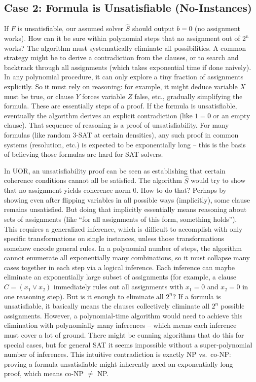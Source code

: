\documentclass[11pt]{article}
\begin{document}
\subsection{Case 2: Formula is Unsatisfiable (No-Instances)}
If \(F\) is unsatisfiable, our assumed solver \(\hat{S}\) should output \(b=0\) (no assignment works). How can it be sure within polynomial steps that no assignment out of \(2^n\) works? The algorithm must systematically eliminate all possibilities. A common strategy might be to derive a contradiction from the clauses, or to search and backtrack through all assignments (which takes exponential time if done naively). In any polynomial procedure, it can only explore a tiny fraction of assignments explicitly. So it must rely on reasoning: for example, it might deduce variable \(X\) must be true, or clause \(Y\) forces variable \(Z\) false, etc., gradually simplifying the formula. These are essentially steps of a proof. If the formula is unsatisfiable, eventually the algorithm derives an explicit contradiction (like \(1=0\) or an empty clause). That sequence of reasoning is a proof of unsatisfiability. For many formulas (like random 3-SAT at certain densities), any such proof in common systems (resolution, etc.) is expected to be exponentially long -- this is the basis of believing those formulas are hard for SAT solvers.

In UOR, an unsatisfiability proof can be seen as establishing that certain coherence conditions cannot all be satisfied. The algorithm \(\hat{S}\) would try to show that no assignment yields coherence norm 0. How to do that? Perhaps by showing even after flipping variables in all possible ways (implicitly), some clause remains unsatisfied. But doing that implicitly essentially means reasoning about sets of assignments (like “for all assignments of this form, something holds”). This requires a generalized inference, which is difficult to accomplish with only specific transformations on single instances, unless those transformations somehow encode general rules. In a polynomial number of steps, the algorithm cannot enumerate all exponentially many combinations, so it must collapse many cases together in each step via a logical inference. Each inference can maybe eliminate an exponentially large subset of assignments (for example, a clause \(C = (x_1 \vee x_2)\) immediately rules out all assignments with \(x_1=0\) and \(x_2=0\) in one reasoning step). But is it enough to eliminate all \(2^n\)? If a formula is unsatisfiable, it basically means the clauses collectively eliminate all \(2^n\) possible assignments. However, a polynomial-time algorithm would need to achieve this elimination with polynomially many inferences -- which means each inference must cover a lot of ground. There might be cunning algorithms that do this for special cases, but for general SAT it seems impossible without a super-polynomial number of inferences. This intuitive contradiction is exactly NP vs.\ co-NP: proving a formula unsatisfiable might inherently need an exponentially long proof, which means co-NP \(\neq\) NP.
\end{document}
